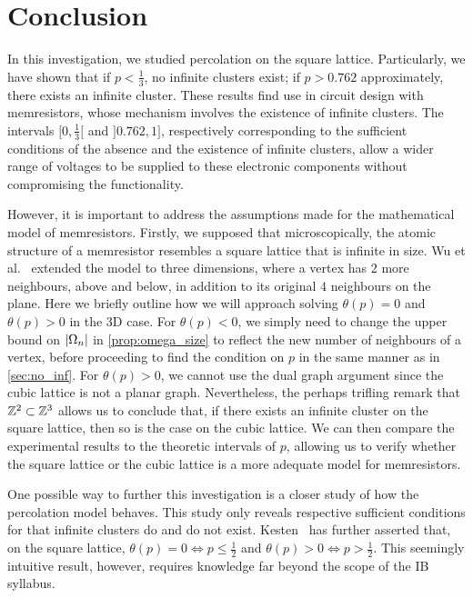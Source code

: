 \documentclass[a4paper, 12pt]{article}
\begin{document}
\section{Conclusion}
In this investigation, we studied percolation on the square lattice. Particularly, we have shown that if $p < \frac{1}{3}$, no infinite clusters exist; if $p > 0.762$ approximately, there exists an infinite cluster. These results find use in circuit design with memresistors, whose mechanism involves the existence of infinite clusters. The intervals $[0, \frac{1}{3}[$ and $]0.762, 1]$, respectively corresponding to the sufficient conditions of the absence and the existence of infinite clusters, allow a wider range of voltages to be supplied to these electronic components without compromising the functionality.

However, it is important to address the assumptions made for the mathematical model of memresistors. Firstly, we supposed that microscopically, the atomic structure of a memresistor resembles a square lattice that is infinite in size. Wu et al.~\autocite*[4]{application} extended the model to three dimensions, where a vertex has $2$ more neighbours, above and below, in addition to its original $4$ neighbours on the plane. Here we briefly outline how we will approach solving $\theta(p) = 0$ and $\theta(p) > 0$ in the 3D case. For $\theta(p) < 0$, we simply need to change the upper bound on $\lvert \Omega_n \rvert$ in \cref{prop:omega_size} to reflect the new number of neighbours of a vertex, before proceeding to find the condition on $p$ in the same manner as in \cref{sec:no_inf}. For $\theta(p) > 0$, we cannot use the dual graph argument since the cubic lattice is not a planar graph. Nevertheless, the perhaps trifling remark that $\mathbb{Z}^2 \subset \mathbb{Z}^3$ allows us to conclude that, if there exists an infinite cluster on the square lattice, then so is the case on the cubic lattice. We can then compare the experimental results to the theoretic intervals of $p$, allowing us to verify whether the square lattice or the cubic lattice is a more adequate model for memresistors.

One possible way to further this investigation is a closer study of how the percolation model behaves. This study only reveals respective sufficient conditions for that infinite clusters do and do not exist. Kesten~\autocite*[42]{kesten_1980} has further asserted that, on the square lattice, $\theta(p) = 0 \iff p \leq \frac{1}{2}$ and $\theta(p) > 0 \iff p > \frac{1}{2}$. This seemingly intuitive result, however, requires knowledge far beyond the scope of the IB syllabus.
\end{document}
